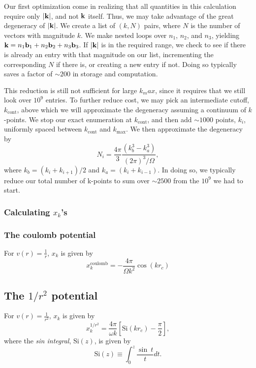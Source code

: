 Our first optimization come in realizing that all quantities in this
calculation require only $|\vk|$, and not $\vk$ itself.  Thus, we may
take advantage of the great degeneracy of $|\vk|$.  We create a list
of $(k,N)$ pairs, where $N$ is the number of vectors with magnitude $k$.
We make nested loops over
$n_1$, $n_2$, and $n_3$, yielding $\vk = n_1 \vb_1 + n_2 \vb_2 + n_3
\vb_3$. If $|\vk|$ is in the required range, we check to see if there
is already an entry with that magnitude on our list, incrementing the
corresponding $N$ if there is, or creating a new entry if not.  Doing
so typically saves a factor of $\sim 200$ in storage and computation.

This reduction is still not sufficient for large $k_max$, since it
requires that we still look over $10^9$ entries.  To further reduce
cost, we may pick an intermediate cutoff, $k_{\text{cont}}$, above which
we will approximate the degeneracy assuming a continuum of
$k$-points.  We stop our exact enumeration at $k_{\text{cont}}$, and
then add $\sim 1000$ points, $k_i$, uniformly spaced between $k_{\text{cont}}$
and $k_{\text{max}}$. We then approximate the degeneracy by
\begin{equation}
N_i = \frac{4 \pi}{3} \frac{\left( k_b^3 -k_a^3\right)}{(2\pi)^3/\Omega},
\end{equation}
where $k_b = (k_i + k_{i+1})/2$ and $k_a = (k_i + k_{i-1})$.  In doing
so, we typically reduce our total number of k-points to sum over $\sim
2500$ from the $10^9$ we had to start.

\subsubsection{Calculating $x_k$'s}
\subsubsection*{The coulomb potential}
For $v(r) = \frac{1}{r}$, $x_k$ is given by
\begin{equation}
x_k^{\text{coulomb}} = -\frac{4 \pi}{\Omega k^2} \cos(k r_c)
\end{equation}

\subsection*{The $1/r^2$ potential}
For $v(r) = \frac{1}{r^2}$, $x_k$ is given by
\begin{equation}
x_k^{1/r^2} = \frac{4 \pi}{\omega k} 
\left[ \text{Si}(k r_c) -\frac{\pi}{2}\right],
\end{equation}
where the {\em sin integral}, $\text{Si}(z)$, is given by
\begin{equation}
\text{Si}(z) \equiv \int_0^z \frac{\sin \ t}{t} dt.
\end{equation}


